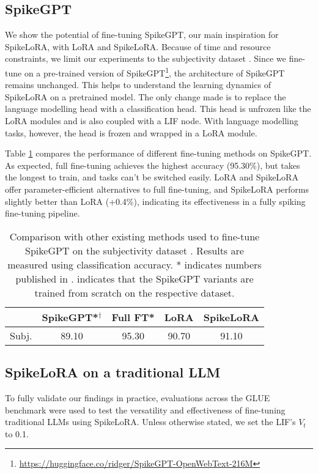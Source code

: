\documentclass{article} %
\begin{document}
\subsection{SpikeGPT}
We show the potential of fine-tuning SpikeGPT, our main inspiration for SpikeLoRA, with LoRA and SpikeLoRA. Because of time and resource constraints, we limit our experiments to the subjectivity dataset \citep{pang_sentimental_2004}. Since we fine-tune on a pre-trained version of SpikeGPT\footnote{\url{https://huggingface.co/ridger/SpikeGPT-OpenWebText-216M}}, the architecture of SpikeGPT remains unchanged. This helps to understand the learning dynamics of SpikeLoRA on a pretrained model. The only change made is to replace the language modelling head with a classification head. This head is unfrozen like the LoRA modules and is also coupled with a LIF node. With language modelling tasks, however, the head is frozen and wrapped in a LoRA module.

Table \ref{tab:spikegpt} compares the performance of different fine-tuning methods on SpikeGPT. As expected, full fine-tuning achieves the highest accuracy (95.30\%), but takes the longest to train, and tasks can't be switched easily. LoRA and SpikeLoRA offer parameter-efficient alternatives to full fine-tuning, and SpikeLoRA performs slightly better than LoRA (+0.4\%), indicating its effectiveness in a fully spiking fine-tuning pipeline.

\begin{table}[htbp]
  \centering
  \begin{tabular}{lcccc}
    \toprule
    & SpikeGPT*$^\dagger$ & Full FT* & LoRA & SpikeLoRA \\
    \midrule
    Subj. & 89.10 & 95.30 & 90.70 & 91.10 \\
    \bottomrule
  \end{tabular}
  \caption{Comparison with other existing methods used to fine-tune SpikeGPT on the subjectivity dataset \citep{pang_sentimental_2004}. Results are measured using classification accuracy. * indicates numbers published in \cite{zhu_spikegpt_2024-1}. \textsuperscript{\textdagger} indicates that the SpikeGPT variants are trained from scratch on the respective dataset.}
  \label{tab:spikegpt}
\end{table}

\subsection{SpikeLoRA on a traditional LLM}
\label{results}
To fully validate our findings in practice, evaluations across the GLUE benchmark were used to test the versatility and effectiveness of fine-tuning traditional LLMs using SpikeLoRA. Unless otherwise stated, we set the LIF's \(V_t\) to 0.1.
\end{document}
